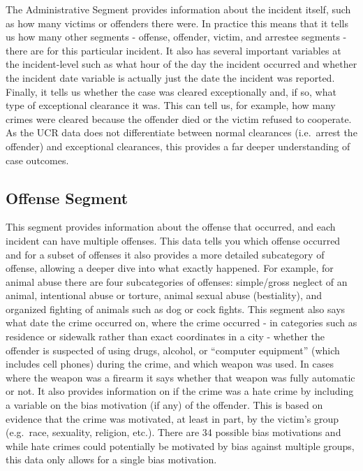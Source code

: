 \documentclass[
]{krantz}
\begin{document}
The Administrative Segment provides information about the
incident itself, such as how many victims or offenders there
were. In practice this means that it tells us how many other
segments - offense, offender, victim, and arrestee segments
- there are for this particular incident. It also has
several important variables at the incident-level such as
what hour of the day the incident occurred and whether the
incident date variable is actually just the date the
incident was reported. Finally, it tells us whether the case
was cleared exceptionally and, if so, what type of
exceptional clearance it was. This can tell us, for example,
how many crimes were cleared because the offender died or
the victim refused to cooperate. As the UCR data does not
differentiate between normal clearances (i.e.~arrest the
offender) and exceptional clearances, this provides a far
deeper understanding of case outcomes.

\subsection{Offense Segment}\label{offense-segment}

This segment provides information about the offense that
occurred, and each incident can have multiple offenses. This
data tells you which offense occurred and for a subset of
offenses it also provides a more detailed subcategory of
offense, allowing a deeper dive into what exactly happened.
For example, for animal abuse there are four subcategories
of offenses: simple/gross neglect of an animal, intentional
abuse or torture, animal sexual abuse (bestiality), and
organized fighting of animals such as dog or cock fights.
This segment also says what date the crime occurred on,
where the crime occurred - in categories such as residence
or sidewalk rather than exact coordinates in a city -
whether the offender is suspected of using drugs, alcohol,
or ``computer equipment'' (which includes cell phones)
during the crime, and which weapon was used. In cases where
the weapon was a firearm it says whether that weapon was
fully automatic or not. It also provides information on if
the crime was a hate crime by including a variable on the
bias motivation (if any) of the offender. This is based on
evidence that the crime was motivated, at least in part, by
the victim's group (e.g.~race, sexuality, religion, etc.).
There are 34 possible bias motivations and while hate crimes
could potentially be motivated by bias against multiple
groups, this data only allows for a single bias motivation.
\end{document}
